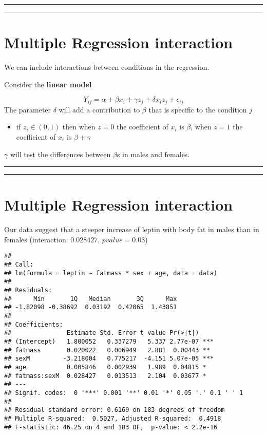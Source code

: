 \documentclass[
]{book}
\providecommand{\tightlist}{%
  \setlength{\itemsep}{0pt}\setlength{\parskip}{0pt}}
\begin{document}
\begin{center}\rule{0.5\linewidth}{0.5pt}\end{center}

\begin{center}\rule{0.5\linewidth}{0.5pt}\end{center}

\hypertarget{multiple-regression-interaction}{%
\section{Multiple Regression interaction}\label{multiple-regression-interaction}}

We can include interactions between conditions in the regression.

Consider the \textbf{linear model}

\[Y_{ij} = \alpha + \beta x_{i} +\gamma z_j + \delta x_{i}z_j +\epsilon_{ij}\]
The parameter \(\delta\) will add a contribution to \(\beta\) that is specific to the condition \(j\)

\begin{itemize}
\tightlist
\item
  if \(z_i \in (0,1)\) then when \(z=0\) the coefficient of \(x_i\) is \(\beta\), when \(z=1\) the coefficient of \(x_i\) is \(\beta+\gamma\)
\end{itemize}

\(\gamma\) will test the differences between \(\beta\)s in males and females.

\begin{center}\rule{0.5\linewidth}{0.5pt}\end{center}

\begin{center}\rule{0.5\linewidth}{0.5pt}\end{center}

\hypertarget{multiple-regression-interaction-1}{%
\section{Multiple Regression interaction}\label{multiple-regression-interaction-1}}

Our data suggest that a steeper increase of leptin with body fat in males than in females (interaction: \(0.028427\), \(pvalue=0.03\))

\begin{verbatim}
## 
## Call:
## lm(formula = leptin ~ fatmass * sex + age, data = data)
## 
## Residuals:
##      Min       1Q   Median       3Q      Max 
## -1.82098 -0.38692  0.03192  0.42065  1.43851 
## 
## Coefficients:
##               Estimate Std. Error t value Pr(>|t|)    
## (Intercept)   1.800052   0.337279   5.337 2.77e-07 ***
## fatmass       0.020022   0.006949   2.881  0.00443 ** 
## sexM         -3.218004   0.775217  -4.151 5.07e-05 ***
## age           0.005846   0.002939   1.989  0.04815 *  
## fatmass:sexM  0.028427   0.013513   2.104  0.03677 *  
## ---
## Signif. codes:  0 '***' 0.001 '**' 0.01 '*' 0.05 '.' 0.1 ' ' 1
## 
## Residual standard error: 0.6169 on 183 degrees of freedom
## Multiple R-squared:  0.5027, Adjusted R-squared:  0.4918 
## F-statistic: 46.25 on 4 and 183 DF,  p-value: < 2.2e-16
\end{verbatim}
\end{document}
